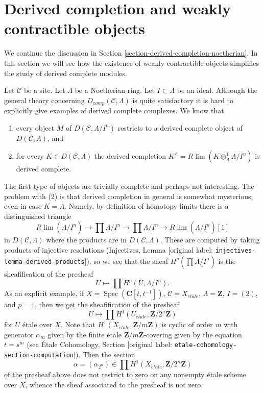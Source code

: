 \documentclass[10pt,a4paper]{article}
\theoremstyle{plain}
\theoremstyle{definition}
\theoremstyle{remark}
\numberwithin{equation}{subsection}
\def\lim{\mathop{\mathrm{lim}}\nolimits}
\def\Spec{\mathop{\mathrm{Spec}}}
\def\etale{{\acute{e}tale}}
\begin{document}
\section{Derived completion and weakly contractible objects}
\label{section-derived-completion-proetale}

\noindent
We continue the discussion in
Section \ref{section-derived-completion-noetherian}.
In this section we will see how the existence of
weakly contractible objects simplifies the study
of derived complete modules.

\medskip\noindent
Let $\mathcal{C}$ be a site. Let $\Lambda$ be a Noetherian ring.
Let $I \subset \Lambda$ be an ideal. Although the general theory
concerning $D_{comp}(\mathcal{C}, \Lambda)$ is quite satisfactory
it is hard to explicitly give examples of derived complete complexes.
We know that
\begin{enumerate}
\item every object $M$ of $D(\mathcal{C}, \Lambda/I^n)$ restricts to a
derived complete object of $D(\mathcal{C}, \Lambda)$, and
\item for every $K \in D(\mathcal{C}, \Lambda)$ the derived completion
$K^\wedge = R\lim (K \otimes_\Lambda^\mathbf{L} \underline{\Lambda/I^n})$
is derived complete.
\end{enumerate}
The first type of objects are trivially complete and perhaps not
interesting. The problem with (2) is that derived completion
in general is somewhat mysterious, even in case $K = \underline{\Lambda}$.
Namely, by definition of homotopy limits there
is a distinguished triangle
$$
R\lim(\underline{\Lambda/I^n}) \to
\prod \underline{\Lambda/I^n} \to
\prod \underline{\Lambda/I^n} \to
R\lim(\underline{\Lambda/I^n})[1]
$$
in $D(\mathcal{C}, \Lambda)$ where the products are in
$D(\mathcal{C}, \Lambda)$. These are computed by taking products
of injective resolutions
(Injectives, Lemma [original label: \nolinkurl{injectives-lemma-derived-products}]),
so we see that the sheaf $H^p(\prod \underline{\Lambda/I^n})$
is the sheafification of the presheaf
$$
U \longmapsto \prod H^p(U, \Lambda/I^n).
$$
As an explicit example, if $X = \Spec(\mathbf{C}[t, t^{-1}])$,
$\mathcal{C} = X_\etale$, $\Lambda = \mathbf{Z}$, $I = (2)$, and
$p = 1$, then we get the sheafification of the presheaf
$$
U \mapsto \prod H^1(U_\etale, \mathbf{Z}/2^n\mathbf{Z})
$$
for $U$ \'etale over $X$. Note that $H^1(X_\etale, \mathbf{Z}/m\mathbf{Z})$
is cyclic of order $m$ with generator $\alpha_m$ given by the finite \'etale
$\mathbf{Z}/m\mathbf{Z}$-covering given by the equation $t = s^m$
(see \'Etale Cohomology, Section [original label: \nolinkurl{etale-cohomology-section-computation}]).
Then the section
$$
\alpha = (\alpha_{2^n}) \in \prod H^1(X_\etale, \mathbf{Z}/2^n\mathbf{Z})
$$
of the presheaf above does not restrict to zero on any nonempty \'etale
scheme over $X$, whence the sheaf associated to the presheaf is not zero.
\end{document}
